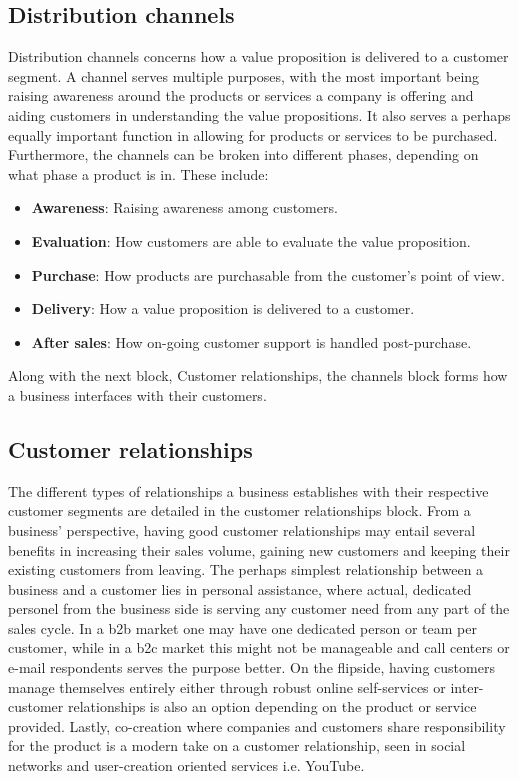 \subsection{Distribution channels}
Distribution channels concerns how a value proposition is delivered to a customer segment. A channel serves multiple purposes, with the most important being raising awareness around the products or services a company is offering and aiding customers in understanding the value propositions. It also serves a perhaps equally important function in allowing for products or services to be purchased. Furthermore, the channels can be broken into different phases, depending on what phase a product is in. These include:

\begin{itemize}
    \item \textbf{Awareness}: Raising awareness among customers.
    \item \textbf{Evaluation}: How customers are able to evaluate the value proposition.
    \item \textbf{Purchase}: How products are purchasable from the customer's point of view.
    \item \textbf{Delivery}: How a value proposition is delivered to a customer.
    \item \textbf{After sales}: How on-going customer support is handled post-purchase.
\end{itemize}
Along with the next block, Customer relationships, the channels block forms how a business interfaces with their customers. 

\subsection{Customer relationships}
The different types of relationships a business establishes with their respective customer segments are detailed in the customer relationships block. From a business' perspective, having good customer relationships may entail several benefits in increasing their sales volume, gaining new customers and keeping their existing customers from leaving. The perhaps simplest relationship between a business and a customer lies in personal assistance, where actual, dedicated personel from the business side is serving any customer need from any part of the sales cycle. In a \gls{b2b} market one may have one dedicated person or team per customer, while in a \gls{b2c} market this might not be manageable and call centers or e-mail respondents serves the purpose better. On the flipside, having customers manage themselves entirely either through robust online self-services or inter-customer relationships is also an option depending on the product or service provided. Lastly, co-creation where companies and customers share responsibility for the product is a modern take on a customer relationship, seen in social networks and user-creation oriented services i.e. YouTube.

